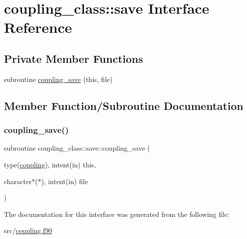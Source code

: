 \hypertarget{interfacecoupling__class_1_1save}{}\section{coupling\+\_\+class\+:\+:save Interface Reference}
\label{interfacecoupling__class_1_1save}
\subsection*{Private Member Functions}
\begin{DoxyCompactItemize}
\item 
subroutine \hyperlink{interfacecoupling__class_1_1save_ad5c9bf3a9d432f1824f9753cb2fdf02f}{coupling\+\_\+save} (this, file)
\end{DoxyCompactItemize}


\subsection{Member Function/\+Subroutine Documentation}
\mbox{\label{interfacecoupling__class_1_1save_ad5c9bf3a9d432f1824f9753cb2fdf02f}} 
\subsubsection{\texorpdfstring{coupling\+\_\+save()}{coupling\_save()}}
{\footnotesize\ttfamily subroutine coupling\+\_\+class\+::save\+::coupling\+\_\+save (\begin{DoxyParamCaption}\item[{type(\hyperlink{structcoupling__class_1_1coupling}{coupling}), intent(in)}]{this,  }\item[{character$\ast$($\ast$), intent(in)}]{file }\end{DoxyParamCaption})\hspace{0.3cm}{\ttfamily [private]}}



The documentation for this interface was generated from the following file\+:\begin{DoxyCompactItemize}
\item 
src/\hyperlink{coupling_8f90}{coupling.\+f90}\end{DoxyCompactItemize}
